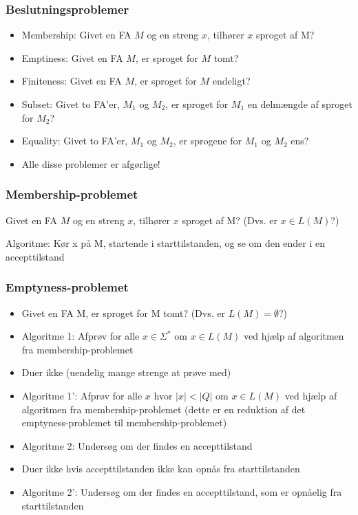 \documentclass{beamer}
\begin{document}
\begin{frame}
\frametitle{Beslutningsproblemer}
\begin{itemize}[<+->]
\item  Membership: Givet en FA $M$ og en streng $x$, tilhører $x$  
    sproget af M? 
\item  Emptiness:  Givet en FA $M$, er sproget for $M$ tomt? 
\item  Finiteness:  Givet en FA $M$, er sproget for $M$ endeligt? 
\item  Subset:  Givet to FA’er, $M_1$ og $M_2$, er sproget for $M_1$ en  
       delmængde af sproget for $M_2$? 
\item  Equality:  Givet to FA’er, $M_1$ og $M_2$, er sprogene for $M_1$  
                og $M_2$ ens? 
\item  Alle disse problemer er afgørlige!
\end{itemize}
\end{frame}

\begin{frame}
\frametitle{Membership-problemet}
Givet en FA $M$ og en streng $x$, tilhører $x$ sproget af M? 
(Dvs. er $x\in L(M)$?)
\pause

Algoritme: 
Kør x på M, startende i starttilstanden, og se om den  
ender i en accepttilstand
\end{frame}

\begin{frame}
\frametitle{Emptyness-problemet}
\begin{itemize}[<+->]
\item Givet en FA M, er sproget for M tomt? 
(Dvs. er $L(M)=\emptyset$?) 
\item Algoritme 1:
  Afprøv for alle $x\in \Sigma^*$ om $x\in L(M)$ ved hjælp af  
  algoritmen fra membership-problemet
\item Duer ikke (uendelig mange strenge at prøve med)
\item
  Algoritme 1': Afprøv for alle $x$ hvor $|x|<|Q|$ om $x\in L(M)$ ved
  hjælp af algoritmen fra membership-problemet (dette er en reduktion
  af det emptyness-problemet til membership-problemet)
\item
  Algoritme 2: 
  Undersøg om der findes en accepttilstand
\item Duer ikke hvis accepttilstanden ikke kan opnås fra starttilstanden
\item
  Algoritme 2': 
  Undersøg om der findes en accepttilstand, som er  
  opnåelig fra starttilstanden

\end{itemize}
\end{frame}
\end{document}
